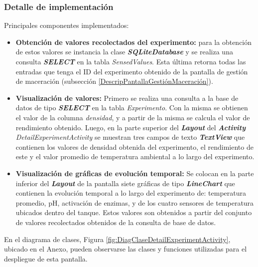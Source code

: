            \subsubsection{Detalle de implementación}
            \par Principales componentes implementados:
            \begin{itemize}
                \item \textbf{Obtención de valores recolectados del experimento:} para la obtención de estos valores se instancia la clase \textbf{\textit{\gls{SQLiteDatabase}}} y se realiza una consulta \textbf{\textit{\gls{SELECT}}} en la tabla \textit{SensedValues}. Esta última retorna todas las entradas que tenga el ID del experimento obtenido de la pantalla de gestión de maceración (subsección \ref{DescripPantallaGestiónMaceración}).
                
                \item \textbf{Visualización de valores:} Primero se realiza una consulta a la base de datos de tipo \textbf{\textit{\gls{SELECT}}} en la tabla \textit{Experimento}. Con la misma se obtienen el valor de la columna \textit{densidad}, y a partir de la misma se calcula el valor de rendimiento obtenido. Luego, en la parte superior del \textbf{\textit{\gls{Layout}}} del \textbf{\textit{\gls{Activity}}} \textit{DetailExperimentActivity} se muestran tres campos de texto \textbf{\textit{\gls{TextView}}} que contienen los valores de densidad obtenida del experimento, el rendimiento de este y el valor promedio de temperatura ambiental a lo largo del experimento.
                
                \item \textbf{Visualización de gráficas de evolución temporal:} Se colocan en la parte inferior del \textbf{\textit{\gls{Layout}}} de la pantalla siete gráficas de tipo \textbf{\textit{\gls{LineChart}}} que contienen la evolución temporal a lo largo del experimento de: temperatura promedio, pH, activación de enzimas, y de los cuatro sensores de temperatura ubicados dentro del tanque. Estos valores son obtenidos a partir del conjunto de valores recolectados obtenidos de la consulta de base de datos.
            \end{itemize}
            
            \par En el diagrama de clases, Figura \ref{fig:DiagClaseDetailExperimentActivity}, ubicado en el Anexo, pueden observarse las clases y funciones utilizadas para el despliegue de esta pantalla.
            
